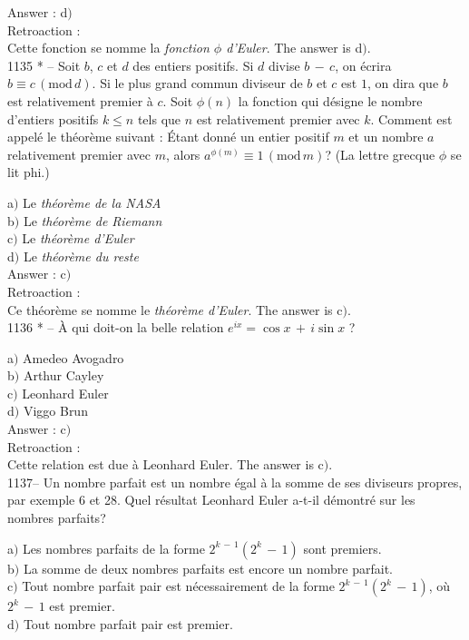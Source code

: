 ﻿\documentclass[letterpaper, 12pt]{article}
\begin{document}
Answer : d$)$\\

Retroaction : \\
Cette fonction se nomme la {\sl fonction $\phi$ d'Euler}. The answer is
d$)$. \\

1135 * -- Soit $b$, $c$ et $d$ des entiers positifs. Si $d$ divise
$b\,-\,c$, on \'ecrira $b\equiv c\,(\mathrm{mod}\,d)$. Si le plus
grand commun diviseur de $b$ et $c$ est $1$, on dira que $b$ est
relativement premier \`a $c$. Soit $\phi(n)$ la fonction qui
d\'esigne le nombre d'entiers positifs $k\le n$ tels que $n$ est
relativement premier avec $k$. Comment est appel\'e le th\'eor\`eme
suivant : \og\'Etant donn\'e un entier positif $m$ et un nombre $a$
relativement premier avec $m$, alors $a^{\phi(m)}\equiv
1\,(\mathrm{mod}\,m)$\fg ? (La lettre grecque $\phi$ se lit phi.)

a$)$ Le {\sl th\'eor\`eme de la NASA} \\
b$)$ Le {\sl th\'eor\`eme de Riemann}  \\
c$)$ Le {\sl th\'eor\`eme d'Euler}   \\
d$)$ Le {\sl th\'eor\`eme du reste}  \\

Answer : c$)$\\

Retroaction : \\
Ce th\'eor\`eme se nomme le {\sl th\'eor\`eme d'Euler}. The answer is
c$)$. \\

1136 * -- \`A qui doit-on la belle relation $e^{ix}=\cos x\,+\,i\sin
x$ ?

a$)$ Amedeo Avogadro \\
b$)$ Arthur Cayley  \\
c$)$ Leonhard Euler   \\
d$)$ Viggo Brun  \\

Answer : c$)$\\

Retroaction : \\
Cette relation est due \`a {Leonhard Euler}. The answer is c$)$. \\

1137-- Un nombre parfait est un nombre \'egal \`a la somme de ses
diviseurs propres, par exemple 6 et 28. Quel r\'esultat Leonhard
Euler a-t-il d\'emontr\'e sur les nombres parfaits?

a$)$ Les nombres parfaits de la forme $2^{k\,-\,1}(2^k\,-\,1)$ sont
premiers.  \\
b$)$ La somme de deux nombres parfaits est encore un nombre parfait. \\
c$)$ Tout nombre parfait pair est n\'ecessairement de la forme
$2^{k\,-\,1}(2^k\,-\,1)$, o\`u $2^k\,-\,1$ est premier. \\
d$)$ Tout nombre parfait pair est premier. \\
\end{document}
